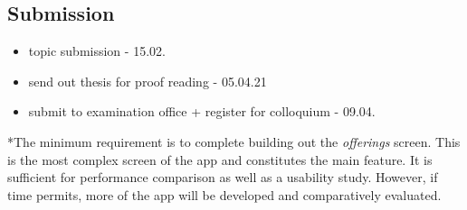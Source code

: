\subsection{Submission}
\begin{itemize}
    \item topic submission - 15.02.
    \item send out thesis for proof reading - 05.04.21
    \item submit to examination office + register for colloquium - 09.04.
\end{itemize}

*The minimum requirement is to complete building out the \textit{offerings} screen. 
This is the most complex screen of the app and constitutes the main feature. 
It is sufficient for performance comparison as well as a usability study. 
However, if time permits, more of the app will be developed and comparatively evaluated. \\

\iffalse
\section{Following Chapter Summary}
\textit{- TODO: Describe structure of thesis and summarize each chapter. 
This should be somehow interwoven into introduction.}
\fi